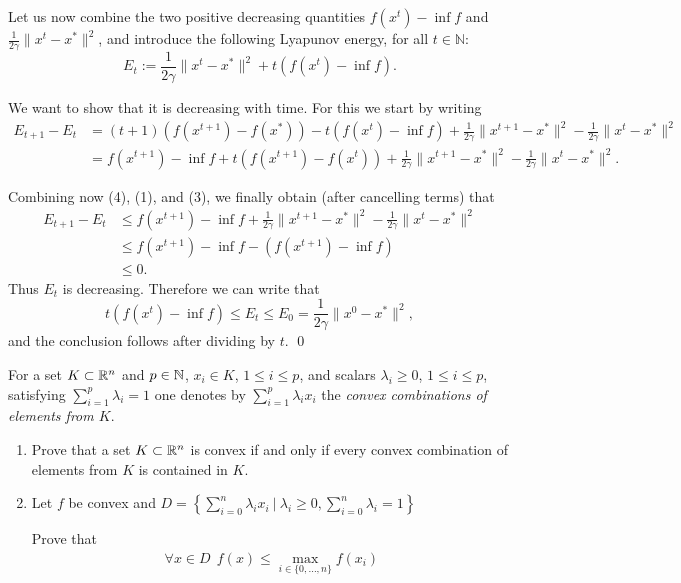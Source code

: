 \documentclass{ExerciseSheet}
\begin{document}
\begin{solution}
Let us now combine the two positive decreasing quantities $f(x^t) - \inf f$ and $\frac{1}{2\gamma} \|x^t - x^*\|^2$, and introduce the following Lyapunov energy, for all $t \in \mathbb{N}$:
\[
E_t := \frac{1}{2\gamma} \|x^t - x^*\|^2 + t(f(x^t) - \inf f).
\]

We want to show that it is decreasing with time.
For this we start by writing
\begin{align}
E_{t+1} - E_t &= (t+1)(f(x^{t+1}) - f(x^*)) - t(f(x^t) - \inf f) + \frac{1}{2\gamma} \|x^{t+1} - x^*\|^2 - \frac{1}{2\gamma} \|x^t - x^*\|^2 \nonumber \\
&= f(x^{t+1}) - \inf f + t(f(x^{t+1}) - f(x^t)) + \frac{1}{2\gamma} \|x^{t+1} - x^*\|^2 - \frac{1}{2\gamma} \|x^t - x^*\|^2.
\tag{4}
\end{align}

Combining now (4), (1), and (3), we finally obtain (after cancelling terms) that
\begin{align*}
E_{t+1} - E_t &\leq f(x^{t+1}) - \inf f + \frac{1}{2\gamma} \|x^{t+1} - x^*\|^2 - \frac{1}{2\gamma} \|x^t - x^*\|^2 \\
&\leq f(x^{t+1}) - \inf f - (f(x^{t+1}) - \inf f) \\
&\leq 0.
\end{align*}
Thus $E_t$ is decreasing. Therefore we can write that
\[
t(f(x^t) - \inf f) \leq E_t \leq E_0 = \frac{1}{2\gamma} \|x^0 - x^*\|^2,
\]
and the conclusion follows after dividing by $t$. \qed
\end{solution}
\fi

\vskip 0.5cm

\begin{problem}

For a set $K\subset \mathbb{R}^n$ and $p\in \mathbb{N}$, $x_i \in K$, $1\leq i\leq p$, and scalars $\lambda_i \geq 0$, $1\leq i\leq p$, satisfying $ \displaystyle\sum_{i=1}^{p}{\lambda_i}=1$ one denotes by $ \displaystyle\sum_{i=1}^{p}{\lambda_i x_i}$ the \emph{convex combinations of elements from $K$}. 

\begin{enumerate}
 \item Prove that a set $K \subset \mathbb{R}^n$ is convex if and only if every convex combination of elements from $K$ is contained in $K$.

 \item Let $f$ be convex and $D = \left\{\displaystyle\sum_{i=0}^{n}\lambda_ix_i ~|~ \lambda_i\geq0, \sum_{i=0}^{n}\lambda_i=1\right\}$
 
       Prove that 
         \begin{align*}
             \forall x\in D ~~ f(x) \leq \displaystyle\max_{i\in\{0,\dots,n\}}f(x_i)
         \end{align*}
 \end{enumerate}

\end{problem}
\end{document}
